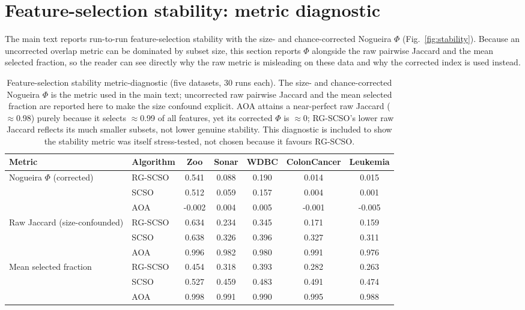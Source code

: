 \documentclass[9pt]{article}
\begin{document}
\FloatBarrier
\section{Feature-selection stability: metric diagnostic}
The main text reports run-to-run feature-selection stability with the size- and
chance-corrected Nogueira $\Phi$ (Fig.~\ref{fig:stability}). Because an
uncorrected overlap metric can be dominated by subset size, this section
reports $\Phi$ alongside the raw pairwise Jaccard and the mean selected fraction,
so the reader can see directly why the raw metric is misleading on these data and
why the corrected index is used instead.

\begin{table}[t]
\centering
\caption{Feature-selection stability metric-diagnostic (five datasets, 30 runs each). The size- and chance-corrected Nogueira $\Phi$ is the metric used in the main text; uncorrected raw pairwise Jaccard and the mean selected fraction are reported here to make the size confound explicit. AOA attains a near-perfect raw Jaccard ($\approx$0.98) purely because it selects $\approx$0.99 of all features, yet its corrected $\Phi$ is $\approx$0; RG-SCSO's lower raw Jaccard reflects its much smaller subsets, not lower genuine stability. This diagnostic is included to show the stability metric was itself stress-tested, not chosen because it favours RG-SCSO.}
\label{tab:stabilitydiag}
\footnotesize
\begin{tabular}{llccccc}
\toprule
Metric & Algorithm & Zoo & Sonar & WDBC & ColonCancer & Leukemia \\
\midrule
\multirow{3}{*}{Nogueira $\Phi$ (corrected)} & RG-SCSO & 0.541 & 0.088 & 0.190 & 0.014 & 0.015 \\
 & SCSO & 0.512 & 0.059 & 0.157 & 0.004 & 0.001 \\
 & AOA & -0.002 & 0.004 & 0.005 & -0.001 & -0.005 \\
\midrule
\multirow{3}{*}{Raw Jaccard (size-confounded)} & RG-SCSO & 0.634 & 0.234 & 0.345 & 0.171 & 0.159 \\
 & SCSO & 0.638 & 0.326 & 0.396 & 0.327 & 0.311 \\
 & AOA & 0.996 & 0.982 & 0.980 & 0.991 & 0.976 \\
\midrule
\multirow{3}{*}{Mean selected fraction} & RG-SCSO & 0.454 & 0.318 & 0.393 & 0.282 & 0.263 \\
 & SCSO & 0.527 & 0.459 & 0.483 & 0.491 & 0.474 \\
 & AOA & 0.998 & 0.991 & 0.990 & 0.995 & 0.988 \\
\bottomrule
\end{tabular}
\end{table}
\end{document}
